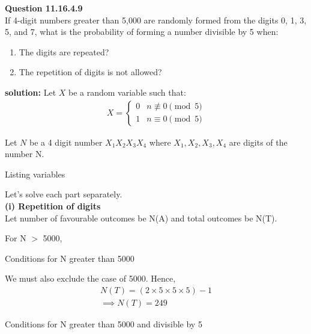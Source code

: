 \documentclass{article}
\begin{document}
\providecommand{\pr}[1]{\ensuremath{\Pr\left(#1\right)}}
\providecommand{\brak}[1]{\ensuremath{\left(#1\right)}}
\newcommand{\solution}{\noindent \textbf{solution: }}

\textbf{Question 11.16.4.9}\\
If 4-digit numbers greater than 5,000 are randomly formed from the digits 0, 1, 3, 5, and 7, what is the probability of forming a number divisible by 5 when:
\begin{enumerate}
    \item The digits are repeated?
    \item The repetition of digits is not allowed?
\end{enumerate}
\fi
\solution 
Let $X$ be a random variable such that:
\begin{align}
	X = \begin{cases}
		0 & n \not\equiv 0 \pmod{5}\\
		1 & n \equiv 0 \pmod{5}\end{cases}
\end{align}

Let $N$ be a 4 digit number $X_{1}X_{2}X_{3}X_{4}$ where $X_{1},X_{2},X_{3},X_{4}$ are digits of the number N.

\begin{table}[h]
    \centering
    
    \caption{Listing variables}
    \label{table_1_anek}
    \end{table}

Let's solve each part separately. \\

\textbf{(i) Repetition of digits}\\
Let number of favourable outcomes be N(A) and total outcomes be N(T).

For N $>$ 5000,

\begin{table}[h]
    \centering
    
    \caption{Conditions for N greater than 5000}
    \label{table_2_anek}
    \end{table}

We must also exclude the case of 5000.
Hence,
\begin{align}
	N(T)=(2\times5\times5\times5)-1 \\
	\implies N(T)=249
\end{align}

\begin{table}[h]
    \centering
    
    \caption{Conditions for N greater than 5000 and divisible by 5}
    \label{table_3_anek}
    \end{table}
\end{document}
